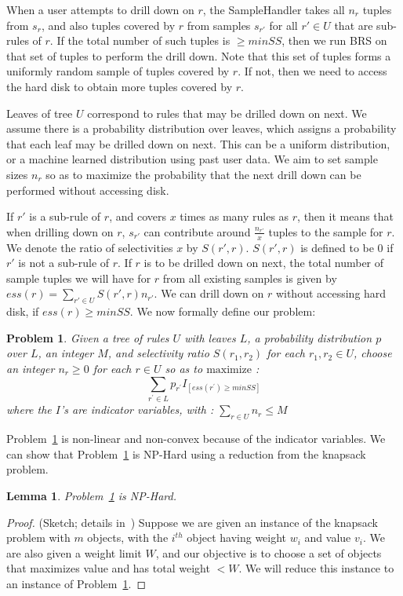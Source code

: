 \documentclass[10pt,journal,compsoc]{IEEEtran}
\newtheorem{lemma}{Lemma}
\newcounter{prob}
\newtheorem{problem}[prob]{Problem}
\begin{document}
{When a user attempts to drill down on $r$, the SampleHandler takes all $n_r$ tuples from $s_r$, and also tuples covered by $r$ from samples $s_{r'}$ for all $r' \in U$ that are sub-rules of $r$. If the total number of such tuples is $\geq minSS$, then we run BRS on that set of tuples to perform the drill down. Note that this set of tuples forms a uniformly random sample of tuples covered by $r$. If not, then we need to access the hard disk to obtain more tuples covered by $r$.

Leaves of tree $U$ correspond to rules that may be drilled down on next. We assume there is a probability distribution over leaves, which assigns a probability that each leaf may be drilled down on next. This can be a uniform distribution, or a machine learned distribution using past user data. We aim to set sample sizes $n_r$ so as to maximize the probability that the next drill down can be performed without accessing disk. 

If $r'$ is a sub-rule of $r$, and covers $x$ times as many rules as $r$, then it means that when drilling down on $r$, $s_{r'}$ can contribute around $\frac{n_{r'}}{x}$ tuples to the sample for $r$. We denote the ratio of selectivities $x$ by $S(r',r)$. $S(r',r)$ is defined to be $0$ if $r'$ is not a sub-rule of $r$. If $r$ is to be drilled down on next, the total number of sample tuples we will have for $r$ from all existing samples is given by $ess(r) = \sum_{r'\in U} S(r', r)n_{r'}$. We can drill down on $r$ without accessing hard disk, if $ess(r) \geq minSS$. We now formally define our problem: 
\begin{problem}\label{prob:sample-sizes}
Given a tree of rules $U$ with leaves $L$, a probability distribution $p$ over $L$, an integer $M$, and selectivity ratio $S(r_1, r_2)$ for each $r_1, r_2 \in U$, 
choose an integer $n_r \geq 0$ for each $r \in U$ so as to $\textrm{maximize}$ :
$$\sum_{r^{\prime} \in L} p_{r^{\prime}}I_{[ess(r^{\prime}) \geq minSS]}$$
where the $I$'s are indicator variables, with :
$\sum_{r \in U} n_r \leq M$
\end{problem}
Problem~\ref{prob:sample-sizes} is non-linear and non-convex because of the indicator variables. 
We can show that Problem~\ref{prob:sample-sizes} is {\sc NP-Hard} using a reduction from the knapsack problem. 
\begin{lemma}\label{lemma:sampling-hardness}
Problem~\ref{prob:sample-sizes} is {\sc NP-Hard}.
\end{lemma}
\begin{proof}(Sketch; details in~\cite{DBLP:journals/pvldb/JoglekarGP15})
Suppose we are given an instance of the knapsack problem with $m$ objects, with the $i^{th}$ object having weight $w_i$ and value $v_i$. We are also given a weight limit $W$, and our objective is to choose a set of objects that maximizes value and has total weight $< W$. We will reduce this instance to an instance of Problem~\ref{prob:sample-sizes}.


\end{proof}}
\end{document}
